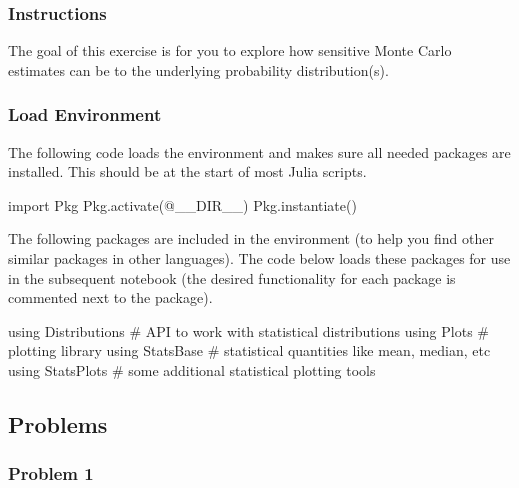 \documentclass[
  letterpaper,
  DIV=11,
  numbers=noendperiod]{scrartcl}
\newenvironment{Shaded}{\begin{snugshade}}{\end{snugshade}}
\newcommand{\BuiltInTok}[1]{\textcolor[rgb]{0.00,0.23,0.31}{#1}}
\newcommand{\CommentTok}[1]{\textcolor[rgb]{0.37,0.37,0.37}{#1}}
\newcommand{\FunctionTok}[1]{\textcolor[rgb]{0.28,0.35,0.67}{#1}}
\newcommand{\ImportTok}[1]{\textcolor[rgb]{0.00,0.46,0.62}{#1}}
\newcommand{\NormalTok}[1]{\textcolor[rgb]{0.00,0.23,0.31}{#1}}
\newcommand{\PreprocessorTok}[1]{\textcolor[rgb]{0.68,0.00,0.00}{#1}}
\begin{document}
\subsubsection{Instructions}\label{instructions}

The goal of this exercise is for you to explore how sensitive Monte
Carlo estimates can be to the underlying probability distribution(s).

\subsubsection{Load Environment}\label{load-environment}

The following code loads the environment and makes sure all needed
packages are installed. This should be at the start of most Julia
scripts.

\begin{Shaded}
\begin{Highlighting}[]
\ImportTok{import} \BuiltInTok{Pkg}
\BuiltInTok{Pkg}\NormalTok{.}\FunctionTok{activate}\NormalTok{(}\PreprocessorTok{@\_\_DIR\_\_}\NormalTok{)}
\BuiltInTok{Pkg}\NormalTok{.}\FunctionTok{instantiate}\NormalTok{()}
\end{Highlighting}
\end{Shaded}

The following packages are included in the environment (to help you find
other similar packages in other languages). The code below loads these
packages for use in the subsequent notebook (the desired functionality
for each package is commented next to the package).

\begin{Shaded}
\begin{Highlighting}[]
\ImportTok{using} \BuiltInTok{Distributions} \CommentTok{\# API to work with statistical distributions}
\ImportTok{using} \BuiltInTok{Plots} \CommentTok{\# plotting library}
\ImportTok{using} \BuiltInTok{StatsBase} \CommentTok{\# statistical quantities like mean, median, etc}
\ImportTok{using} \BuiltInTok{StatsPlots} \CommentTok{\# some additional statistical plotting tools}
\end{Highlighting}
\end{Shaded}

\subsection{Problems}\label{problems}

\subsubsection{Problem 1}\label{problem-1}
\end{document}
